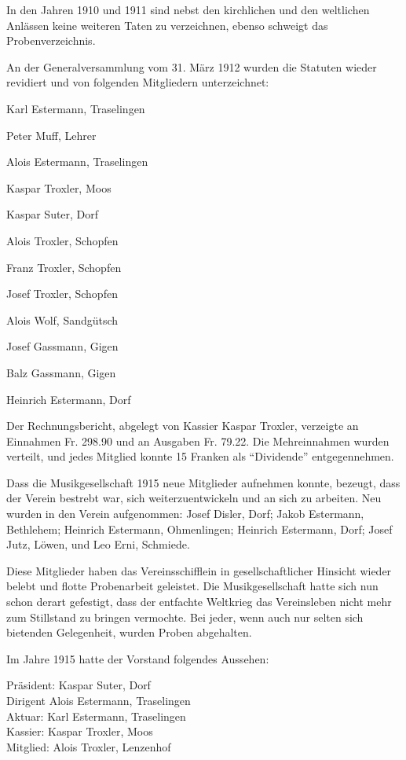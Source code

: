 \begin{history}
    In den Jahren 1910 und 1911 sind nebst den kirchlichen und den weltlichen
    Anlässen keine weiteren Taten zu verzeichnen, ebenso schweigt das
    Probenverzeichnis.

    \bigskip

    An der Generalversammlung vom 31. März 1912 wurden die Statuten wieder
    revidiert und von folgenden Mitgliedern unterzeichnet:

    Karl Estermann, Traselingen

    Peter Muff, Lehrer

    Alois Estermann, Traselingen

    Kaspar Troxler, Moos

    Kaspar Suter, Dorf

    Alois Troxler, Schopfen

    Franz Troxler, Schopfen

    Josef Troxler, Schopfen

    Alois Wolf, Sandgütsch

    Josef Gassmann, Gigen

    Balz Gassmann, Gigen

    Heinrich Estermann, Dorf

    \bigskip

    Der Rechnungsbericht, abgelegt von Kassier Kaspar Troxler, verzeigte an
    Einnahmen Fr. 298.90 und an Ausgaben Fr. 79.22. Die Mehreinnahmen wurden
    verteilt, und jedes Mitglied konnte 15 Franken als \enquote{Dividende}
    entgegennehmen.

    Dass die Musikgesellschaft 1915 neue Mitglieder aufnehmen konnte, bezeugt,
    dass der Verein bestrebt war, sich weiterzuentwickeln und an sich zu
    arbeiten. Neu wurden in den Verein aufgenommen: Josef Disler, Dorf; Jakob
    Estermann, Bethlehem; Heinrich Estermann, Ohmenlingen; Heinrich Estermann,
    Dorf; Josef Jutz, Löwen, und Leo Erni, Schmiede.

    Diese Mitglieder haben das Vereinsschifflein in gesellschaftlicher Hinsicht
    wieder belebt und flotte Probenarbeit geleistet. Die Musikgesellschaft hatte
    sich nun schon derart gefestigt, dass der entfachte Weltkrieg das
    Vereinsleben nicht mehr zum Stillstand zu bringen vermochte. Bei jeder, wenn
    auch nur selten sich bietenden Gelegenheit, wurden Proben abgehalten.

    Im Jahre 1915 hatte der Vorstand folgendes Aussehen:

    \noindent
    Präsident: Kaspar Suter, Dorf\\
    Dirigent Alois Estermann, Traselingen\\
    Aktuar: Karl Estermann, Traselingen\\
    Kassier: Kaspar Troxler, Moos\\
    Mitglied: Alois Troxler, Lenzenhof


\end{history}
